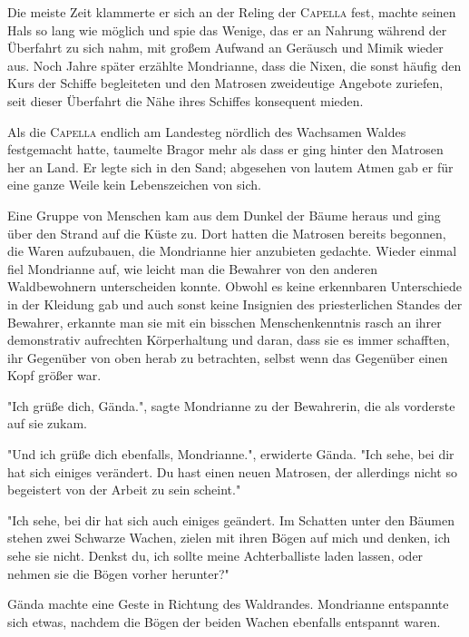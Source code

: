 \documentclass[10pt, a4paper, oneside]{book}
\begin{document}
\begin{multicols}{2}
Die meiste Zeit klammerte er sich an der Reling der \textsc{Capella} fest, machte seinen Hals so lang wie möglich und spie das Wenige, das er an Nahrung während der Überfahrt zu sich nahm, mit großem Aufwand an Geräusch und Mimik wieder aus. Noch Jahre später erzählte Mondrianne, dass die Nixen, die sonst häufig den Kurs der Schiffe begleiteten und den Matrosen zweideutige Angebote zuriefen, seit dieser Überfahrt die Nähe ihres Schiffes konsequent mieden. 

Als die \textsc{Capella} endlich am Landesteg nördlich des Wachsamen Waldes festgemacht hatte, taumelte Bragor mehr als dass er ging hinter den Matrosen her an Land. Er legte sich in den Sand; abgesehen von lautem Atmen gab er für eine ganze Weile kein Lebenszeichen von sich. 

Eine Gruppe von Menschen kam aus dem Dunkel der Bäume heraus und ging über den Strand auf die Küste zu. Dort hatten die Matrosen bereits begonnen, die Waren aufzubauen, die Mondrianne hier anzubieten gedachte. Wieder einmal fiel Mondrianne auf, wie leicht man die Bewahrer von den anderen Waldbewohnern unterscheiden konnte. Obwohl es keine erkennbaren Unterschiede in der Kleidung gab und auch sonst keine Insignien des priesterlichen Standes der Bewahrer, erkannte man sie mit ein bisschen Menschenkenntnis rasch an ihrer demonstrativ aufrechten Körperhaltung und daran, dass sie es immer schafften, ihr Gegenüber von oben herab zu betrachten, selbst wenn das Gegenüber einen Kopf größer war. 

"Ich grüße dich, Gända.", sagte Mondrianne zu der Bewahrerin, die als vorderste auf sie zukam. 

"Und ich grüße dich ebenfalls, Mondrianne.", erwiderte Gända. "Ich sehe, bei dir hat sich einiges verändert. Du hast einen neuen Matrosen, der allerdings nicht so begeistert von der Arbeit zu sein scheint." 

"Ich sehe, bei dir hat sich auch einiges geändert. Im Schatten unter den Bäumen stehen zwei Schwarze Wachen, zielen mit ihren Bögen auf mich und denken, ich sehe sie nicht. Denkst du, ich sollte meine Achterballiste laden lassen, oder nehmen sie die Bögen vorher herunter?" 

Gända machte eine Geste in Richtung des Waldrandes. Mondrianne entspannte sich etwas, nachdem die Bögen der beiden Wachen ebenfalls entspannt waren. 


\end{multicols}
\end{document}
